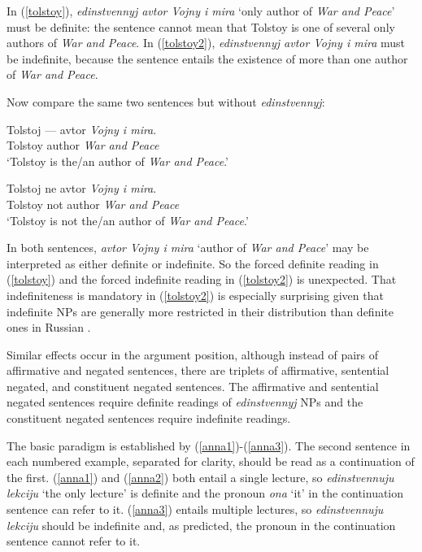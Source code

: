 In (\ref{tolstoy}), \textit{edinstvennyj avtor Vojny i mira} `only author of \textit{War and Peace}' must be definite: the sentence cannot mean that Tolstoy is one of several only authors of \textit{War and Peace}. In (\ref{tolstoy2}), \textit{edinstvennyj avtor Vojny i mira} must be indefinite, because the sentence entails the existence of more than one author of \textit{War and Peace}.


Now compare the same two sentences but without \textit{edinstvennyj}:

\begin{exe}
	\ex \gll Tolstoj --- avtor \textit{Vojny i mira}.\\
	Tolstoy {} author \textit{War and Peace}\\
	\glt `Tolstoy is the/an author of \textit{War and Peace}.'
	
	\ex \gll Tolstoj ne avtor \textit{Vojny i mira}.\\
	Tolstoy not author \textit{War and Peace} \\
	\glt `Tolstoy is not the/an author of \textit{War and Peace}.'
\end{exe}

In both sentences, \textit{avtor Vojny i mira} `author of \textit{War and Peace}' may be interpreted as either definite or indefinite. So the forced definite reading in (\ref{tolstoy}) and the forced indefinite reading in (\ref{tolstoy2}) is unexpected. That indefiniteness is mandatory in (\ref{tolstoy2}) is especially surprising given that indefinite NPs are generally more restricted in their distribution than definite ones in Russian \citep{geist2010}.

Similar effects occur in the argument position, although instead of pairs of affirmative and negated sentences, there are triplets of affirmative, sentential negated, and constituent negated sentences. The affirmative and sentential negated sentences require definite readings of \textit{edinstvennyj} NPs and the constituent negated sentences require indefinite readings.

The basic paradigm is established by (\ref{anna1})-(\ref{anna3}). The second sentence in each numbered example, separated for clarity, should be read as a continuation of the first. (\ref{anna1}) and (\ref{anna2}) both entail a single lecture, so \textit{edinstvennuju lekciju} `the only lecture' is definite and the pronoun \textit{ona} `it' in the continuation sentence can refer to it. (\ref{anna3}) entails multiple lectures, so \textit{edinstvennuju lekciju} should be indefinite and, as predicted, the pronoun in the continuation sentence cannot refer to it.

